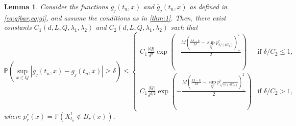 \documentclass[11pt,reqno,a4paper]{amsart}
\newtheorem{lemma}[theorem]{Lemma}
\theoremstyle{definition}
\numberwithin{equation}{section}
\newcommand{\widebar}[1]{\overline{#1}}
\renewcommand{\P}{\mathbb{P}}
\DeclareMathOperator{\1}{\mathbbm{1}}
\begin{document}
\begin{lemma} \label{lemma:gjbar:gj}
  Consider the functions $g_j(t_n,x)$ and $\widebar{g}_j(t_n,x)$ as defined in \cref{eq:gjbar,eq:gj}, and assume the conditions as in \cref{thm:1}.
  Then, there exist constants $C_1(d, L,Q,\lambda_1,\lambda_2)$ and $C_2(d, L,Q,\lambda_1,\lambda_2)$ such that
  \begin{equation*}
    \P(\sup_{x \in Q} |\widebar{g}_j(t_n,x) - g_j(t_n,x)| \geq \delta)
    \leq
    \begin{cases}
      C_1 \frac{|Q|}{\delta^d} \exp \left (-\frac{M \left (\frac{M-k}{M} - \sup_Q p_{\delta/(4 C_2)}^c \right )_+^2}{2} \right )            & \text{if } \delta/C_2 \leq 1,
      \\
      C_1 \frac{|Q|}{\delta^{d/2}} \exp \left (-\frac{M \left (\frac{M-k}{M} - \sup_Q p_{\sqrt{\delta/(4 C_2)}}^c \right )_+^2}{2} \right ) & \text{if } \delta/C_2 > 1,
    \end{cases}
  \end{equation*}
  where $p_{r}^c(x) = \P(X_{t_n}^{1} \not \in B_{r}(x))$.
\end{lemma}
\end{document}
